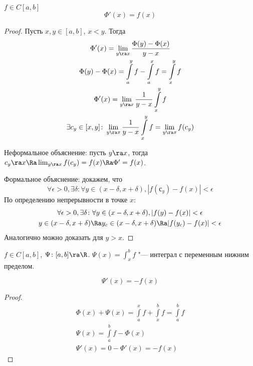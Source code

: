 \begin{theorem}[Барроу]
	$f \in C[a, b]$
	\[\Phi'(x) = f(x)\]
\end{theorem}
\begin{proof}
	Пусть $x, y \in [a, b]$, $x < y$.
	Тогда
	\begin{gather*}
		\Phi'(x) = \lim_{y \ra x} \frac{\Phi (y) - \Phi(x)}{y - x} \\
		\Phi (y) - \Phi (x) = \int\limits_a^y f - \int\limits_a^x f = \int\limits_x^y f \\
		\Phi' (x) = \lim_{y \ra x} \frac{1}{y - x} \int\limits_x^y f \\
		\exists c_y \in [x, y]\colon \lim_{y \ra x} \frac{1}{y - x} \int\limits_x^y f = \lim_{y \ra x} f(c_y)
	\end{gather*}

	Неформальное объяснение: пусть $y \ra x$, тогда $c_y \ra x \Ra \lim_{y \ra x} f(c_y) = f(x) \Ra \Phi' = f(x)$.

	Формальное объяснение: докажем, что
	\[ \forall \epsilon > 0, \exists \delta\colon \forall y \in (x - \delta, x + \delta), |f(с_y) - f(x)| < \epsilon \]
	По определению непрерывности в точке $x$:
	\begin{gather*}
		\forall \epsilon > 0, \exists \delta\colon \forall y \in (x - \delta, x + \delta), |f(y) - f(x)| < \epsilon \\
		y \in (x - \delta, x + \delta) \Ra y_c \in (x - \delta, x + \delta) \Ra |f(y_c) - f(x)| < \epsilon
	 \end{gather*}
	Аналогично можно доказать для $y > x$.
\end{proof}

\begin{Def}
	$f \in C[a, b]$, $\Psi \colon [a, b] \ra \R$.
	$\Psi (x) = \int_x^b f$ "--- интеграл с переменным нижним пределом.
\end{Def}

\begin{conseq}
	\[ \Psi'(x) = -f(x) \]
\end{conseq}
\begin{proof}
	\begin{gather*}
		\Phi (x) + \Psi (x) = \int\limits_a^x f + \int\limits_x^b f = \int\limits_a^b f \\
		\Psi(x) = \int\limits_a^b f - \Phi(x)\\
		\Psi'(x) =  0 - \Phi'(x) = -f(x)
	\end{gather*}
\end{proof}

